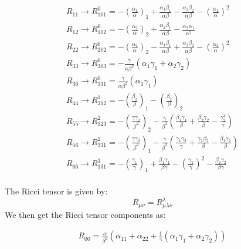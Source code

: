 \documentclass{article}
\begin{document}
\begin{center}
\begin{equation}
\begin{array}{l}
R_{11}\rightarrow R_{101}^{0}=-\left(\frac{\alpha_{1}}{\alpha}\right)_{1}+\frac{\alpha_{1}\beta_{1}}{\alpha\beta}-\frac{\alpha_{2}\beta_{2}}{\alpha\beta}-\left(\frac{\alpha_{1}}{\alpha}\right)^{2}\\
R_{12}\rightarrow R_{102}^{0}=-\left(\frac{\alpha_{2}}{\alpha}\right)_{2}+\frac{\alpha_{2}\beta_{1}}{\alpha\beta}-\frac{\alpha_{2}\alpha_{1}}{\alpha^{2}}\\
R_{22}\rightarrow R_{202}^{0}=-\left(\frac{\alpha_{2}}{\alpha}\right)_{2}-\frac{\alpha_{1}\beta_{1}}{\alpha\beta}+\frac{\alpha_{2}\beta_{2}}{\alpha\beta}-\left(\frac{\alpha_{2}}{\alpha}\right)^{2}\\
R_{33}\rightarrow R_{303}^{0}=-\frac{\gamma}{\alpha\beta^{2}}\left(\alpha_{1}\gamma_{1}+\alpha_{2}\gamma_{2}\right)\\
R_{36}\rightarrow R_{331}^{0}=\frac{\gamma}{\alpha\beta^{2}}\left(\alpha_{1}\gamma_{1}\right)\\
R_{44}\rightarrow R_{212}^{1}=-\left(\frac{\beta_{1}}{\beta}\right)_{1}-\left(\frac{\beta_{2}}{\beta}\right)_{2}\\
R_{55}\rightarrow R_{323}^{2}=-\left(\frac{\gamma\gamma_{2}}{\beta^{2}}\right)_{2}-\frac{\gamma}{\beta^{2}}\left(\frac{\beta_{1}\gamma_{1}}{\beta}+\frac{\beta_{2}\gamma_{2}}{\beta}-\frac{\gamma_{2}^{2}}{\gamma}\right)\\
R_{56}\rightarrow R_{331}^{2}=-\left(\frac{\gamma\gamma_{2}}{\beta^{2}}\right)_{1}-\frac{\gamma}{\beta^{2}}\left(\frac{\gamma_{1}\gamma_{2}}{\gamma}+\frac{\gamma_{1}\beta_{2}}{\beta}-\frac{\beta_{1}\gamma_{2}}{\beta}\right)\\
R_{66}\rightarrow R_{131}^{3}=-\left(\frac{\gamma_{1}}{\gamma}\right)_{1}+\frac{\beta_{1}\gamma_{1}}{\beta\gamma}-\left(\frac{\gamma_{1}}{\gamma}\right)^{2}-\frac{\beta_{2}\gamma_{2}}{\beta\gamma}\\
\end{array}
\end{equation}
\end{center}
The Ricci tensor is given by:
\begin{equation}
R_{\mu\nu}=R_{\mu\lambda\nu}^{\lambda}
\end{equation}
We then get the Ricci tensor components as:
\begin{center}
\begin{equation}
\begin{array}{l}
R_{00}=\frac{\alpha}{\beta^{2}}\left(\alpha_{11}+\alpha_{22}+\frac{1}{\gamma}\left(\alpha_{1}\gamma_{1}+\alpha_{2}\gamma_{2}\right)\right)\\
\end{array}
\end{equation}
\end{center}
\end{document}
